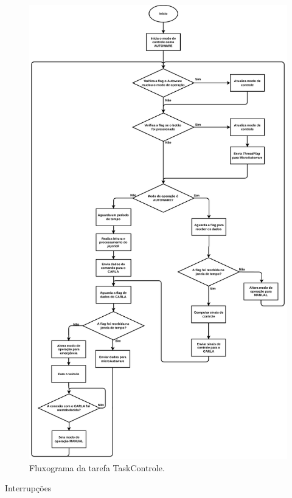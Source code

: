 \begin{figure}[H]
	\centering
	\includegraphics[height= 1\textheight]{img/fluxograma_taskcontrole}
	\caption{Fluxograma da tarefa TaskControle.}
	\label{fig:fluxograma_taskcontrole}
\end{figure}

\noindent Interrupções

